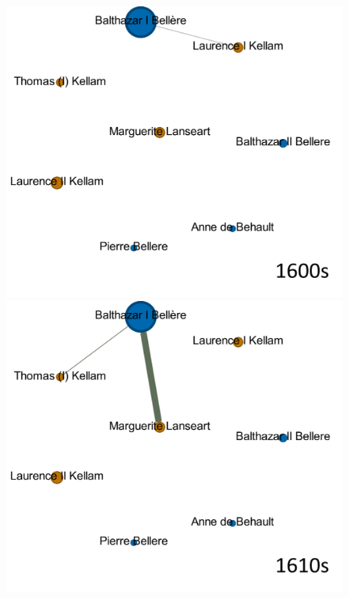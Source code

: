 \documentclass[12pt,a4paper,oneside]{book}
\begin{document}
\begin{sloppypar}
\begin{figure}[H]
\centering
\includegraphics[scale=0.32]{graph/B&K_1600s.png}
\includegraphics[scale=0.32]{graph/B&K_1610s.png}

\end{figure}
\end{sloppypar}
\end{document}
